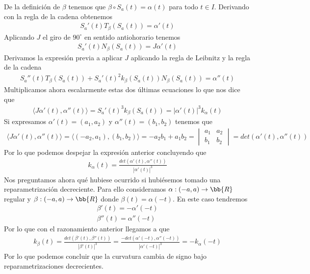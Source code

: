 \begin{ejercicio}
    De la definición de $\beta$ tenemos que $\beta \circ S_a(t) = \alpha(t)$ para todo $t\in I$. Derivando con la regla de la cadena obtenemos
    \begin{gather*}
        S_a'(t)T_\beta(S_a(t)) = \alpha'(t)
    \end{gather*}
    Aplicando $J$ el giro de $90^\circ$ en sentido antiohorario tenemos
    \begin{gather*}
        S_a'(t)N_\beta(S_a(t)) = J\alpha'(t)
    \end{gather*}
    Derivamos la expresión previa a aplicar $J$ aplicando la regla de Leibnitz y la regla de la cadena
    \begin{gather*}
        S_a''(t)T_\beta(S_a(t)) + S_a'(t)^2k_\beta(S_a(t))N_\beta(S_a(t)) = \alpha''(t)
    \end{gather*}
    Multiplicamos ahora escalarmente estas dos últimas ecuaciones lo que nos dice que 
    \begin{gather*}
        \langle J\alpha'(t), \alpha''(t)\rangle = S_a'(t)^3 k_\beta(S_a(t)) = |\alpha'(t)|^3 k_\alpha(t)
    \end{gather*}
    Si expresamos $\alpha'(t)=(a_1, a_2)$ y $\alpha''(t)=(b_1, b_2)$ tenemos que 
    \begin{gather*}
        \langle J\alpha'(t), \alpha''(t)\rangle = \langle (-a_2, a_1), (b_1, b_2) \rangle = -a_2b_1 + a_1b_2 = 
        \begin{vmatrix}
            a_1 & a_2 \\ b_1 & b_2
        \end{vmatrix} = det(\alpha'(t), \alpha''(t))
    \end{gather*}
    Por lo que podemos despejar la expresión anterior concluyendo que 
    \begin{gather*}
        k_\alpha(t) = \frac{det(\alpha'(t), \alpha''(t))}{|\alpha'(t)|^3}
    \end{gather*}
    Nos preguntamos ahora qué hubiese ocurrido si hubiésemos tomado una reparametrización decreciente. Para ello consideramos $\alpha:(-a,a) \to \bb{R}$ regular y $\beta:(-a,a) \to \bb{R}$ donde $\beta(t)=\alpha(-t)$. En este caso tendremos
    \begin{gather*}
        \beta'(t) = -\alpha'(-t)\\
        \beta''(t) = \alpha''(-t)
    \end{gather*}
    Por lo que con el razonamiento anterior llegamos a que 
    \begin{gather*}
        k_\beta(t) = \frac{det(\beta'(t), \beta''(t))}{|\beta'(t)|^3} = \frac{-det(\alpha'(-t), \alpha''(-t))}{|\alpha'(-t)|^3} = -k_\alpha(-t)
    \end{gather*}
    Por lo que podemos concluir que la curvatura cambia de signo bajo reparametrizaciones decrecientes.
\end{ejercicio}

